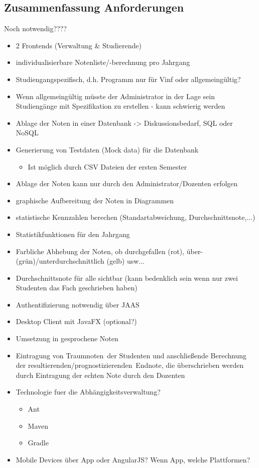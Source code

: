 \documentclass[12pt,a4paper,parskip]{scrreprt}
\begin{document}
\subsection{Zusammenfassung Anforderungen}
Noch notwendig????
\begin{itemize}
\item 2 Frontends (Verwaltung \& Studierende)
\item individualisierbare Notenliste/-berechnung pro Jahrgang
\item Studiengangspezifisch, d.h. Programm nur für Vinf oder allgemeingültig?
\item Wenn allgemeingültig müsste der Administrator in der Lage sein Studiengänge mit Spezifikation zu erstellen - kann schwierig werden

\item Ablage der Noten in einer Datenbank -> Diskussionsbedarf, SQL oder NoSQL
\item Generierung von Testdaten (Mock data) für die Datenbank
\begin{itemize}
	\item Ist möglich durch CSV Dateien der ersten Semester
\end{itemize}
\item Ablage der Noten kann nur durch den Administrator/Dozenten erfolgen
\item graphische Aufbereitung der Noten in Diagrammen
\item statistische Kennzahlen berechen (Standartabweichung, Durchschnittsnote,...)
\item Statistikfunktionen für den Jahrgang
\item Farbliche Abhebung der Noten, ob durchgefallen (rot), über- (grün)/unterdurchschnittlich (gelb) usw...
\item Durchschnittsnote für alle sichtbar (kann bedenklich sein wenn nur zwei Studenten das Fach geschrieben haben)
\item Authentifizierung notwendig über JAAS
\item Desktop Client mit JavaFX (optional?)
\item Umsetzung in \glqq gesprochene Noten\grqq\
\item Eintragung von \glqq Traumnoten\grqq\ der Studenten und anschließende Berechnung der \glqq resultierenden/prognostizierenden\grqq\ Endnote, die überschrieben werden durch Eintragung der echten Note durch den Dozenten
\item Technologie fuer die Abhängigkeitsverwaltung?
\begin{itemize}
\item Ant
\item Maven
\item Gradle
\end{itemize}
\item Mobile Devices über App oder AngularJS? Wenn App, welche Plattformen?
\end{itemize}
\end{document}
